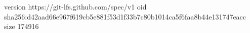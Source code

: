 version https://git-lfs.github.com/spec/v1
oid sha256:d42aad66e967f619cb5e881f53d1f33b7c80b1014ca5f6faa8b44e131747eacc
size 174916
